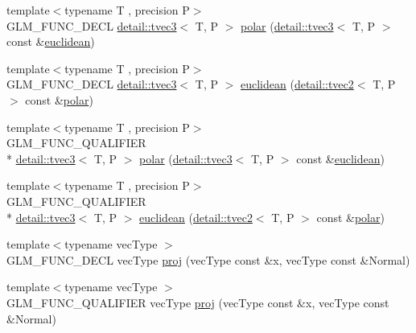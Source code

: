 \begin{DoxyCompactItemize}
\item 
{\footnotesize template$<$typename T , precision P$>$ }\\G\-L\-M\-\_\-\-F\-U\-N\-C\-\_\-\-D\-E\-C\-L \hyperlink{structglm_1_1detail_1_1tvec3}{detail\-::tvec3}$<$ T, P $>$ \hyperlink{group__gtx__polar__coordinates_ga7d0a4068875efec56e5d2c6451b5bde2}{polar} (\hyperlink{structglm_1_1detail_1_1tvec3}{detail\-::tvec3}$<$ T, P $>$ const \&\hyperlink{group__gtx__polar__coordinates_ga221eaf671619626425e9fb5cb69400b0}{euclidean})
\item 
{\footnotesize template$<$typename T , precision P$>$ }\\G\-L\-M\-\_\-\-F\-U\-N\-C\-\_\-\-D\-E\-C\-L \hyperlink{structglm_1_1detail_1_1tvec3}{detail\-::tvec3}$<$ T, P $>$ \hyperlink{group__gtx__polar__coordinates_ga221eaf671619626425e9fb5cb69400b0}{euclidean} (\hyperlink{structglm_1_1detail_1_1tvec2}{detail\-::tvec2}$<$ T, P $>$ const \&\hyperlink{group__gtx__polar__coordinates_ga7d0a4068875efec56e5d2c6451b5bde2}{polar})
\item 
{\footnotesize template$<$typename T , precision P$>$ }\\G\-L\-M\-\_\-\-F\-U\-N\-C\-\_\-\-Q\-U\-A\-L\-I\-F\-I\-E\-R \\*
\hyperlink{structglm_1_1detail_1_1tvec3}{detail\-::tvec3}$<$ T, P $>$ \hyperlink{group__gtx__polar__coordinates_ga7d0a4068875efec56e5d2c6451b5bde2}{polar} (\hyperlink{structglm_1_1detail_1_1tvec3}{detail\-::tvec3}$<$ T, P $>$ const \&\hyperlink{group__gtx__polar__coordinates_ga221eaf671619626425e9fb5cb69400b0}{euclidean})
\item 
{\footnotesize template$<$typename T , precision P$>$ }\\G\-L\-M\-\_\-\-F\-U\-N\-C\-\_\-\-Q\-U\-A\-L\-I\-F\-I\-E\-R \\*
\hyperlink{structglm_1_1detail_1_1tvec3}{detail\-::tvec3}$<$ T, P $>$ \hyperlink{group__gtx__polar__coordinates_ga221eaf671619626425e9fb5cb69400b0}{euclidean} (\hyperlink{structglm_1_1detail_1_1tvec2}{detail\-::tvec2}$<$ T, P $>$ const \&\hyperlink{group__gtx__polar__coordinates_ga7d0a4068875efec56e5d2c6451b5bde2}{polar})
\item 
{\footnotesize template$<$typename vec\-Type $>$ }\\G\-L\-M\-\_\-\-F\-U\-N\-C\-\_\-\-D\-E\-C\-L vec\-Type \hyperlink{group__gtx__projection_gadf29123bcf748fc9d6fb0998192184cf}{proj} (vec\-Type const \&x, vec\-Type const \&Normal)
\item 
{\footnotesize template$<$typename vec\-Type $>$ }\\G\-L\-M\-\_\-\-F\-U\-N\-C\-\_\-\-Q\-U\-A\-L\-I\-F\-I\-E\-R vec\-Type \hyperlink{group__gtx__projection_gadf29123bcf748fc9d6fb0998192184cf}{proj} (vec\-Type const \&x, vec\-Type const \&Normal)

\end{DoxyCompactItemize}
